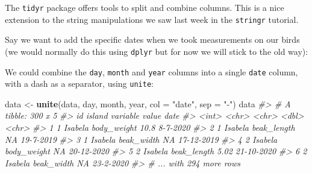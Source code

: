 \documentclass[]{book}
\newenvironment{Shaded}{}{}
\newcommand{\CommentTok}[1]{\textcolor[rgb]{0.38,0.63,0.69}{\textit{#1}}}
\newcommand{\DataTypeTok}[1]{\textcolor[rgb]{0.56,0.13,0.00}{#1}}
\newcommand{\DecValTok}[1]{\textcolor[rgb]{0.25,0.63,0.44}{#1}}
\newcommand{\KeywordTok}[1]{\textcolor[rgb]{0.00,0.44,0.13}{\textbf{#1}}}
\newcommand{\NormalTok}[1]{#1}
\newcommand{\OperatorTok}[1]{\textcolor[rgb]{0.40,0.40,0.40}{#1}}
\newcommand{\OtherTok}[1]{\textcolor[rgb]{0.00,0.44,0.13}{#1}}
\newcommand{\StringTok}[1]{\textcolor[rgb]{0.25,0.44,0.63}{#1}}
\begin{document}
The \texttt{tidyr} package offers tools to split and combine columns. This is a nice extension to the string manipulations we saw last week in the \texttt{stringr} tutorial.

Say we want to add the specific dates when we took measurements on our birds (we would normally do this using \texttt{dplyr} but for now we will stick to the old way):

\begin{Shaded}
\end{Shaded}

We could combine the \texttt{day}, \texttt{month} and \texttt{year} columns into a single \texttt{date} column, with a dash as a separator, using \texttt{unite}:

\begin{Shaded}
\begin{Highlighting}[]
\NormalTok{data <-}\StringTok{ }\KeywordTok{unite}\NormalTok{(data, day, month, year, }\DataTypeTok{col =} \StringTok{"date"}\NormalTok{, }\DataTypeTok{sep =} \StringTok{"-"}\NormalTok{)}
\NormalTok{data}
\CommentTok{#> # A tibble: 300 x 5}
\CommentTok{#>      id island  variable    value date      }
\CommentTok{#>   <int> <chr>   <chr>       <dbl> <chr>     }
\CommentTok{#> 1     1 Isabela body_weight 10.8  8-7-2020  }
\CommentTok{#> 2     1 Isabela beak_length NA    19-7-2019 }
\CommentTok{#> 3     1 Isabela beak_width  NA    17-12-2019}
\CommentTok{#> 4     2 Isabela body_weight NA    20-12-2020}
\CommentTok{#> 5     2 Isabela beak_length  5.02 21-10-2020}
\CommentTok{#> 6     2 Isabela beak_width  NA    23-2-2020 }
\CommentTok{#> # ... with 294 more rows}
\end{Highlighting}
\end{Shaded}
\end{document}
